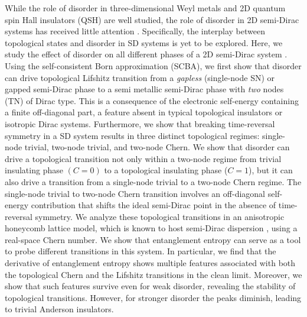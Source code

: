 \documentclass[aps,prb,showpacs,twocolumn,floats]{revtex4-1}
\begin{document}
While the role of disorder in three-dimensional Weyl metals and 2D quantum spin Hall insulators (QSH) \cite{weyl,li,benakker,jiang,tami,roy,prodan} are well studied, the role of disorder in 2D semi-Dirac systems has received little attention \cite{carpent,peng}. Specifically, the interplay between topological states and disorder in SD systems is yet to be explored. Here, we study the effect of disorder on all different phases of a 2D semi-Dirac system \cite{footnote1}. Using the self-consistent Born approximation (SCBA), we first show that disorder can drive topological Lifshitz transition from a {\it gapless} (single-node SN)  or gapped semi-Dirac phase to a semi metallic semi-Dirac phase with {\it two} nodes (TN) of Dirac type. This is a consequence of the electronic self-energy containing a finite off-diagonal part, a feature absent in typical topological insulators \cite{benakker} or isotropic Dirac  \cite{paraj,song} systems. Furthermore, we show that breaking time-reversal symmetry in a SD system results in three distinct topological regimes: single-node trivial, two-node trivial, and two-node Chern. We show that disorder can drive a topological transition not only within a two-node regime from trivial insulating phase $(C=0)$  to a topological insulating phase ($C=1$), but it can also drive a transition from a single-node trivial to a two-node Chern regime.  The single-node trivial to two-node Chern transition involves an off-diagonal self-energy contribution that shifts the ideal semi-Dirac point in the absence of time-reversal symmetry. We analyze these topological transitions in an anisotropic honeycomb lattice model,  which is known to host semi-Dirac dispersion \cite{montam}, using a real-space Chern number. We show that entanglement entropy can serve as a tool to probe different transitions in this system. In particular, we find that the derivative of entanglement entropy shows multiple features associated with both the topological Chern and the Lifshitz transitions in the clean limit. Moreover, we show that such features survive even for weak disorder, revealing the stability of topological transitions. However, for stronger disorder the peaks diminish, leading to trivial Anderson insulators.   

\end{document}

